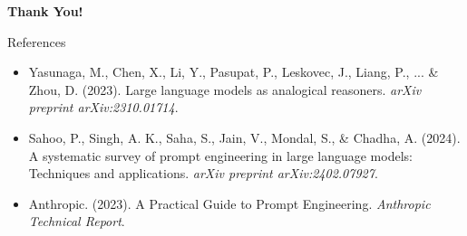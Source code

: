 \documentclass[aspectratio=169,xcolor=dvipsnames]{beamer}
\begin{document}
\begin{frame}
    \Huge{\centerline{\textbf{Thank You!}}}
    \vspace{0.5cm}
    \begin{block}{References}
        \small
        \begin{itemize}
            \item Yasunaga, M., Chen, X., Li, Y., Pasupat, P., Leskovec, J., Liang, P., ... \& Zhou, D. (2023). Large language models as analogical reasoners. \textit{arXiv preprint arXiv:2310.01714}.
            
            \item Sahoo, P., Singh, A. K., Saha, S., Jain, V., Mondal, S., \& Chadha, A. (2024). A systematic survey of prompt engineering in large language models: Techniques and applications. \textit{arXiv preprint arXiv:2402.07927}.
            
            \item Anthropic. (2023). A Practical Guide to Prompt Engineering. \textit{Anthropic Technical Report}.
        \end{itemize}
    \end{block}
\end{frame}

\end{document}
